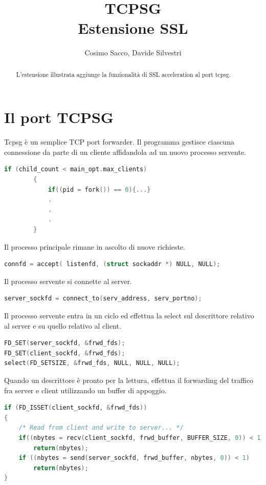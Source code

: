 \documentclass[10pt]{article}  %
\begin{document}
\title{TCPSG\\Estensione SSL}   %
\author{Cosimo Sacco, Davide Silvestri}         %
\date{}    %
\maketitle
\begin{abstract}
    L'estensione illustrata aggiunge la funzionalità di SSL acceleration al port tcpsg.
\end{abstract}
\section{Il port TCPSG}
    \label{sec:tcpsg}
    Tcpsg è un semplice TCP port forwarder.
    Il programma gestisce ciascuna connessione da parte di un cliente affidandola ad un nuovo processo servente.
    \begin{lstlisting}[language=C]
        if (child_count < main_opt.max_clients)
        {
            if((pid = fork()) == 0){...}
            .
            .
            .
        }
    \end{lstlisting}
    Il processo principale rimane in ascolto di nuove richieste.
    \begin{lstlisting}[language=C]
connfd = accept( listenfd, (struct sockaddr *) NULL, NULL);
    \end{lstlisting}
    Il processo servente si connette al server.
    \begin{lstlisting}[language=C]
server_sockfd = connect_to(serv_address, serv_portno);
    \end{lstlisting}
    Il processo servente entra in un ciclo ed effettua la select sul descrittore relativo al server e su quello relativo al client.
    \begin{lstlisting}[language=C]
FD_SET(server_sockfd, &frwd_fds);
FD_SET(client_sockfd, &frwd_fds);
select(FD_SETSIZE, &frwd_fds, NULL, NULL, NULL);
    \end{lstlisting}

    Quando un descrittore è pronto per la lettura, effettua il forwarding del traffico fra server e client utilizzando un buffer di appoggio.
    \begin{lstlisting}[language=C]
if (FD_ISSET(client_sockfd, &frwd_fds))
{
    /* Read from client and write to server... */
    if((nbytes = recv(client_sockfd, frwd_buffer, BUFFER_SIZE, 0)) < 1)
        return(nbytes);
    if ((nbytes = send(server_sockfd, frwd_buffer, nbytes, 0)) < 1)
        return(nbytes);
}
    \end{lstlisting}
\end{document}
